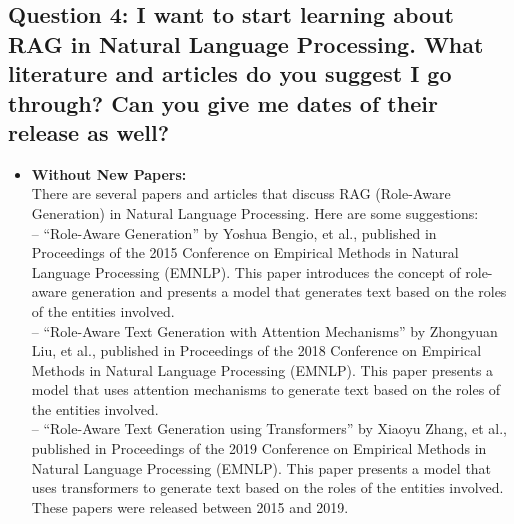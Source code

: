 \documentclass[fleqn,moreauthors,10pt]{ds_report}
\begin{document}
\begin{itemize}
\end{itemize}


\subsection*{Question 4: I want to start learning about RAG in Natural Language Processing. What literature and articles do you suggest I go through? Can you give me dates of their release as well?}

\begin{itemize}
  \item \textbf{Without New Papers:} \\
  There are several papers and articles that discuss RAG (Role-Aware Generation) in Natural Language Processing. Here are some suggestions: \\[6pt]
  -- ``Role-Aware Generation'' by Yoshua Bengio, et al., published in Proceedings of the 2015 Conference on Empirical Methods in Natural Language Processing (EMNLP). This paper introduces the concept of role-aware generation and presents a model that generates text based on the roles of the entities involved.\\
  -- ``Role-Aware Text Generation with Attention Mechanisms'' by Zhongyuan Liu, et al., published in Proceedings of the 2018 Conference on Empirical Methods in Natural Language Processing (EMNLP). This paper presents a model that uses attention mechanisms to generate text based on the roles of the entities involved.\\
  -- ``Role-Aware Text Generation using Transformers'' by Xiaoyu Zhang, et al., published in Proceedings of the 2019 Conference on Empirical Methods in Natural Language Processing (EMNLP). This paper presents a model that uses transformers to generate text based on the roles of the entities involved.\\[6pt]
  These papers were released between 2015 and 2019.


\end{itemize}
\end{document}
